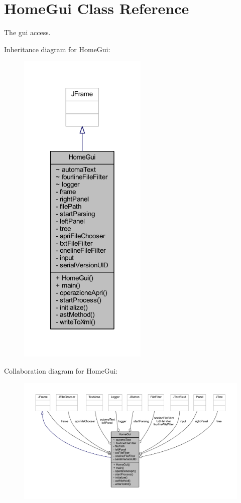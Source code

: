 \hypertarget{class_home_gui}{\section{Home\-Gui Class Reference}
\label{class_home_gui}
}


The gui access.  




Inheritance diagram for Home\-Gui\-:\nopagebreak
\begin{figure}[H]
\begin{center}
\leavevmode
\includegraphics[width=174pt]{class_home_gui__inherit__graph}
\end{center}
\end{figure}


Collaboration diagram for Home\-Gui\-:\nopagebreak
\begin{figure}[H]
\begin{center}
\leavevmode
\includegraphics[width=350pt]{class_home_gui__coll__graph}
\end{center}
\end{figure}
